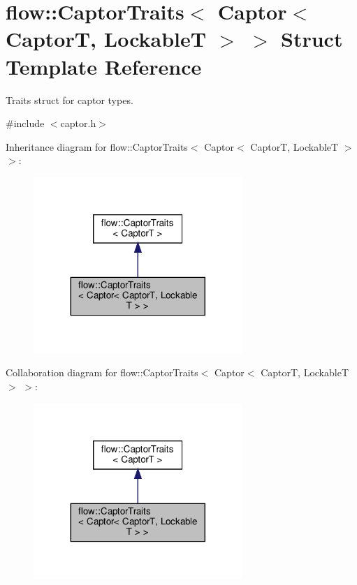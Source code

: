 \hypertarget{structflow_1_1_captor_traits_3_01_captor_3_01_captor_t_00_01_lockable_t_01_4_01_4}{}\section{flow\+:\+:Captor\+Traits$<$ Captor$<$ CaptorT, LockableT $>$ $>$ Struct Template Reference}
\label{structflow_1_1_captor_traits_3_01_captor_3_01_captor_t_00_01_lockable_t_01_4_01_4}


Traits struct for captor types.  




{\ttfamily \#include $<$captor.\+h$>$}



Inheritance diagram for flow\+:\+:Captor\+Traits$<$ Captor$<$ CaptorT, LockableT $>$ $>$\+:\nopagebreak
\begin{figure}[H]
\begin{center}
\leavevmode
\includegraphics[width=224pt]{structflow_1_1_captor_traits_3_01_captor_3_01_captor_t_00_01_lockable_t_01_4_01_4__inherit__graph}
\end{center}
\end{figure}


Collaboration diagram for flow\+:\+:Captor\+Traits$<$ Captor$<$ CaptorT, LockableT $>$ $>$\+:\nopagebreak
\begin{figure}[H]
\begin{center}
\leavevmode
\includegraphics[width=224pt]{structflow_1_1_captor_traits_3_01_captor_3_01_captor_t_00_01_lockable_t_01_4_01_4__coll__graph}
\end{center}
\end{figure}


